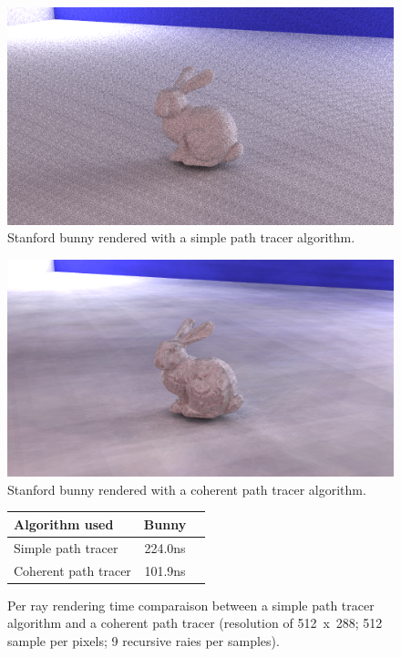 
\begin{figure}[h]
    \centering
    \includegraphics[width=0.8\columnwidth]{render_stanford_bunny_dummy.png}
    \caption{Stanford bunny rendered with a simple path tracer algorithm.}
    \label{fig:stanford_bunny_dummy}
\end{figure}

\begin{figure}[h]
    \centering
    \includegraphics[width=0.8\columnwidth]{render_stanford_bunny_cpt.png}
    \caption{Stanford bunny rendered with a coherent path tracer algorithm.}
    \label{fig:stanford_bunny_cpt}
\end{figure}

\begin{figure}[H]
    \tiny
    \centering
    \begin{tabular}{ | l | c | c | }

        \hline
        Algorithm used & Bunny \\
        \hline
        Simple path tracer & 224.0ns \\
        Coherent path tracer & 101.9ns \\
        \hline

    \end{tabular}
    \caption{
        Per ray rendering time comparaison between a simple path tracer
        algorithm and a coherent path tracer (resolution of 512~x~288; 512
        sample per pixels; 9 recursive raies per samples).
    }
    \label{table:cpt_compare}
\end{figure}
